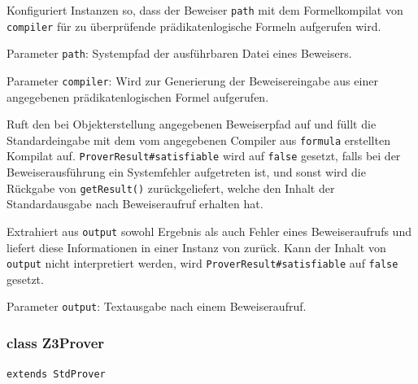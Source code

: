 
\begin{description}%

    Konfiguriert Instanzen so, dass der Beweiser \texttt{path} mit dem
    Formelkompilat von \texttt{compiler} für zu überprüfende
    prädikatenlogische Formeln aufgerufen wird.%

    Parameter \texttt{path}: Systempfad der ausführbaren Datei eines
    Beweisers.%

    Parameter \texttt{compiler}: Wird zur Generierung der
    Beweisereingabe aus einer angegebenen prädikatenlogischen Formel
    aufgerufen.%


    Ruft den bei Objekterstellung angegebenen Beweiserpfad auf und
    füllt die Standardeingabe mit dem vom angegebenen Compiler aus
    \texttt{formula} erstellten Kompilat auf.
    \texttt{ProverResult\#satisfiable} wird auf \texttt{false}
    gesetzt, falls bei der Beweiserausführung ein Systemfehler
    aufgetreten ist, und sonst wird die Rückgabe von
    \texttt{getResult()} zurückgeliefert, welche den Inhalt der
    Standardausgabe nach Beweiseraufruf erhalten hat.%


    Extrahiert aus \texttt{output} sowohl Ergebnis als auch Fehler
    eines Beweiseraufrufs und liefert diese Informationen in einer
    Instanz von  zurück. Kann der Inhalt von
    \texttt{output} nicht interpretiert werden, wird
    \texttt{ProverResult\#satisfiable} auf \texttt{false} gesetzt.%

    Parameter \texttt{output}: Textausgabe nach einem Beweiseraufruf.%

\end{description}%

\subsubsection{class Z3Prover}%

\texttt{extends StdProver}%


\begin{description}%


\end{description}%

